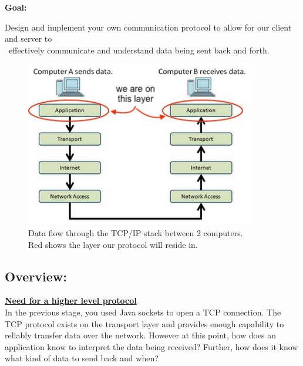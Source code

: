 \documentclass{article}
\begin{document}
\begin{large}\textbf{Goal:}\end{large} Design and implement your own communication protocol to allow for our client and server to\\ \indent \indent \-\ effectively communicate and understand data being sent back and forth.

\begin{figure}[h]
\vspace{0.2cm}
\hspace{-0.8cm}
\includegraphics[width=10cm]{images/networking}
\centering
\captionsetup{justification=centering}
\caption{Data flow through the TCP/IP stack between 2 computers.\\Red shows the layer our protocol will reside in.}
\label{fig:networking}
\end{figure}

\subsection*{Overview:}

\noindent \underline{\textbf{Need for a higher level protocol}} \vspace{0.2cm} \\
In the previous stage, you used Java sockets to open a TCP connection. The TCP protocol exists on the transport layer and provides enough capability to reliably transfer data over the network. However at this point, how does an application know to interpret the data being received? Further, how does it know what kind of data to send back and when?
\end{document}

